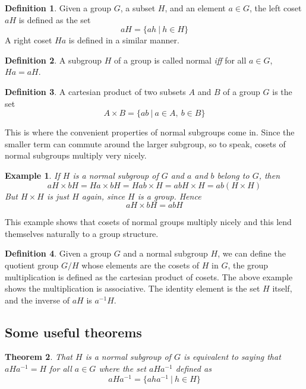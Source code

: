 \documentclass[12pt]{article}
\newtheorem{thm}{Theorem}[section]
\newtheorem{exmp}[thm]{Example}
\theoremstyle{definition}
\newtheorem{defn}{Definition}[section]
\begin{document}
\begin{defn}
Given a group $G$, a subset $H$, and an element $a \in G$, the left coset $aH$ is defined as the set
$$aH = \{ah\ |\ h \in H\}$$
A right coset $Ha$ is defined in a similar manner.
\end{defn}

\begin{defn}
A subgroup $H$ of a group is called normal \emph{iff} for all $a \in G$, $Ha = aH$. 
\end{defn}

\begin{defn}
A cartesian product of two subsets $A$ and $B$ of a group $G$ is the set
$$A \times B = \{ab\ |\ a \in A,\ b \in B\}$$
\end{defn}

This is where the convenient properties of normal subgroups come in. Since the smaller term can commute around the larger subgroup, so to speak, cosets of normal subgroups multiply very nicely.

\begin{exmp}
If $H$ is a normal subgroup of $G$ and $a$ and $b$ belong to $G$, then 
$$aH \times bH = Ha \times bH = Hab \times H = abH \times H = ab(H \times H)$$
But $H \times H$ is just $H$ again, since $H$ is a group. Hence
$$aH \times bH = abH$$
\end{exmp}

This example shows that cosets of normal groups multiply nicely and this lend themselves naturally to a group structure.

\begin{defn}
Given a group $G$ and a normal subgroup $H$, we can define the quotient group $G/H$ whose elements are the cosets of $H$ in $G$, the group multiplication is defined as the cartesian product of cosets. The above example shows the multiplication is associative. The identity element is the set $H$ itself, and the inverse of $aH$ is $a^{-1}H$.
\end{defn}

\subsection{Some useful theorems\cite{herstein}}

\begin{thm}
That $H$ is a normal subgroup of $G$ is equivalent to saying that $aHa^{-1}=H$ for all $a \in G$ where the set $aHa^{-1}$ defined as 
$$aHa^{-1}=\{aha^{-1}\ |\ h \in H\}$$
\end{thm}
\end{document}
